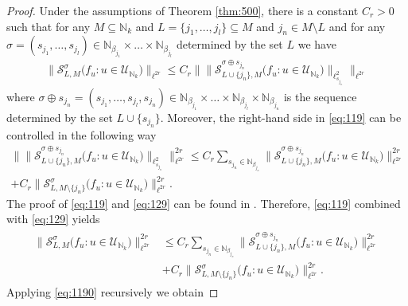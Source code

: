 \documentclass[a4paper,oneside]{amsart}
\theoremstyle{plain}
\theoremstyle{definition}
\numberwithin{equation}{section}
\newcounter{thm}
\theoremstyle{plain}
\newcommand{\NN}{\mathbb{N}}
\newcommand{\8}{\infty}
\begin{document}
\begin{proof}



Under the assumptions of Theorem \ref{thm:500}, there is a constant
$C_r>0$ such that for any $M\subseteq\NN_k$ and $L=\{j_1,\ldots,
j_l\}\subseteq M$ and $j_n\in M\setminus L$ and for any
$\sigma=(s_{j_1}, \ldots,
s_{j_l})\in\NN_{\beta_{j_1}}\times\ldots\times\NN_{\beta_{j_l}}$
determined by the set $L$ we have
\begin{align}
  \label{eq:119}
 \big\| \mathcal S_{L, M}^{\sigma}\big(f_u:u\in\mathcal
  U_{\NN_k}\big)\big\|_{\ell^{2r}}\le C_r\Big\|\big\|\mathcal
  S_{L\cup\{j_n\}, M}^{\sigma\oplus s_{j_n}}\big(f_u:u\in\mathcal
  U_{\NN_k}\big)\big\|_{\ell^2_{s_{j_n}}}\Big\|_{\ell^{2r}}
\end{align}
where $\sigma\oplus s_{j_n}=(s_{j_1},\ldots,s_{j_l},
s_{j_n})\in
\NN_{\beta_{j_1}}\times\ldots\times\NN_{\beta_{j_l}}\times\NN_{\beta_{j_n}}$
is the sequence determined by the set
$L\cup\{s_{j_n}\}$. Moreover, the right-hand side in \eqref{eq:119}
can be controlled in the following way
\begin{multline}
  \label{eq:129}
  \Big\|\big\|\mathcal
  S_{L\cup\{j_n\}, M}^{\sigma\oplus s_{j_n}}\big(f_u:u\in\mathcal
  U_{\NN_k}\big)\big\|_{\ell^2_{ s_{j_n}}}\Big\|_{\ell^{2r}}^{2r}
\le C_r\sum_{s_{j_n}\in\NN_{\beta_{j_n}}}
 \big\|\mathcal S_{L\cup\{j_n\}, M}^{\sigma\oplus s_{j_n}}\big(f_u:u\in\mathcal
  U_{\NN_k}\big)\big\|_{\ell^{2r}}^{2r}\\
+C_r\big\|\mathcal S_{L, M\setminus\{j_n\}}^{\sigma}\big(f_u:u\in\mathcal
  U_{\NN_k}\big)\big\|_{\ell^{2r}}^{2r}.
\end{multline}
The proof of \eqref{eq:119} and \eqref{eq:129} can be found in
\cite{mst1}. Therefore, \eqref{eq:119} combined with 
  \eqref{eq:129} yields
\begin{align}
  \label{eq:1190}
\begin{split}
 \big\| \mathcal S_{L, M}^{\sigma}\big(f_u:u\in\mathcal
  U_{\NN_k}\big)\big\|_{\ell^{2r}}^{2r}&\le 
C_r\sum_{s_{j_n}\in\NN_{\beta_{j_n}}}
 \big\|\mathcal S_{L\cup\{j_n\}, M}^{\sigma\oplus s_{j_n}}\big(f_u:u\in\mathcal
  U_{\NN_k}\big)\big\|_{\ell^{2r}}^{2r}\\
&+C_r\big\|\mathcal S_{L, M\setminus\{j_n\}}^{\sigma}\big(f_u:u\in\mathcal
  U_{\NN_k}\big)\big\|_{\ell^{2r}}^{2r}.
\end{split}
\end{align}
Applying \eqref{eq:1190} recursively we obtain 


\end{proof}
\end{document}
